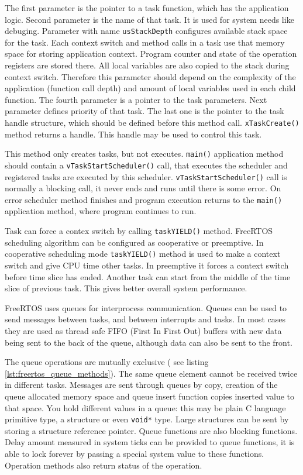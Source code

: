 The first parameter is the pointer to a task function, which has the application logic.
Second parameter is the name of that task. It is used for system needs like debuging.
Parameter with name \texttt{usStackDepth} configures available stack space for the task.
Each context switch and method calls in a task use that memory space for storing application context.
Program counter and state of the operation registers are stored there.
All local variables are also copied to the stack during context switch.
Therefore this parameter should depend on the complexity of the application (function call depth) and
amount of local variables used in each child function. 
The fourth parameter is a pointer to the task parameters. Next parameter defines priority of that task.
The last one is the pointer to the task handle structure, which should be defined before this method call.
\texttt{xTaskCreate()} method returns a handle.  This handle may be used to
control  this task.

This method only creates  tasks, but not executes. 
\texttt{main()} application method should contain a \texttt{vTaskStartScheduler()} call, that executes the scheduler and registered tasks are executed by this scheduler.
\texttt{vTaskStartScheduler()} call is normally a blocking call, it never ends and runs until there is some error.
On error scheduler method finishes and program execution returns to the
\texttt{main()} application method, where program continues to run.


Task can force a contex switch by calling \texttt{taskYIELD()} method.
FreeRTOS scheduling algorithm  can be configured as cooperative or preemptive.
In cooperative scheduling mode \texttt{taskYIELD()} method is used to make a
context switch and give CPU time other tasks.
In preemptive it forces a context switch before time slice has ended.
Another task can start from the middle of the time slice of previous task.
This gives better overall system performance.

FreeRTOS uses queues for interprocess communication.
Queues can be used to send messages between tasks, and between interrupts and
tasks. 
In most cases they are used as thread safe FIFO (First In First Out) buffers with new data being sent to the back of the queue, although data can also be sent to the front. 

The queue operations are  mutually exclusive ( see listing
\autoref{lst:freertos_queue_methods}).
The same queue element cannot be received twice in different tasks.
Messages are sent through queues by copy, creation of the queue allocated memory
space and queue insert function copies inserted value to that space.
You hold different values in a queue: this may be plain C language primitive
type, a structure or even \texttt{void*} type. Large structures can be sent by
storing a structure reference pointer. 
Queue functions are also blocking functions. Delay amount measured in system
ticks can be provided to queue functions, it is able to lock forever by passing
a special system value to these functions. Operation methods also return status
of the operation.
 

